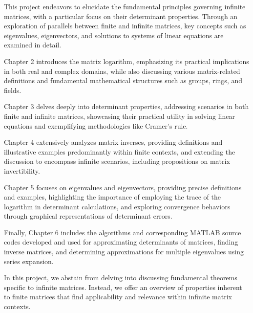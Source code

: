This project endeavors to elucidate the fundamental principles governing infinite matrices, with a particular focus on their determinant properties. Through an exploration of parallels between finite and infinite matrices, key concepts such as eigenvalues, eigenvectors, and solutions to systems of linear equations are examined in detail.

Chapter 2 introduces the matrix logarithm, emphasizing its practical implications in both real and complex domains, while also discussing various matrix-related definitions and fundamental mathematical structures such as groups, rings, and fields.

Chapter 3 delves deeply into determinant properties, addressing scenarios in both finite and infinite matrices, showcasing their practical utility in solving linear equations and exemplifying methodologies like Cramer's rule.

Chapter 4 extensively analyzes matrix inverses, providing definitions and illustrative examples predominantly within finite contexts, and extending the discussion to encompass infinite scenarios, including propositions on matrix invertibility.

Chapter 5 focuses on eigenvalues and eigenvectors, providing precise definitions and examples, highlighting the importance of employing the trace of the logarithm in determinant calculations, and exploring convergence behaviors through graphical representations of determinant errors.

Finally, Chapter 6 includes the algorithms and corresponding MATLAB source codes developed and used for approximating determinants of matrices, finding inverse matrices, and determining approximations for multiple eigenvalues using series expansion.

In this project, we abstain from delving into discussing fundamental theorems specific to infinite matrices. Instead, we offer an overview of properties inherent to finite matrices that find applicability and relevance within infinite matrix contexts.

